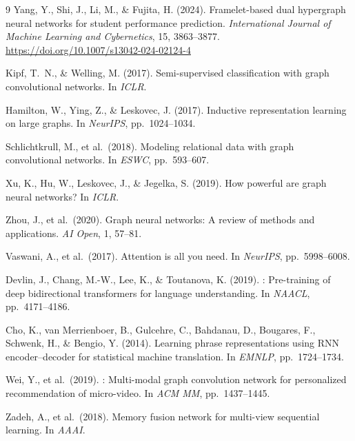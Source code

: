 \documentclass[sigconf,review]{acmart}
\begin{document}
\begin{thebibliography}{9}
Yang, Y., Shi, J., Li, M., \& Fujita, H. (2024).
\newblock Framelet-based dual hypergraph neural networks for student
  performance prediction.
\newblock \emph{International Journal of Machine Learning and Cybernetics},
  15, 3863--3877.
\newblock \url{https://doi.org/10.1007/s13042-024-02124-4}

Kipf, T.~N., \& Welling, M. (2017).
\newblock Semi-supervised classification with graph
  convolutional networks.
\newblock In \emph{ICLR}.

Hamilton, W., Ying, Z., \& Leskovec, J. (2017).
\newblock Inductive representation learning on large
  graphs.
\newblock In \emph{NeurIPS}, pp.\ 1024--1034.

Schlichtkrull, M., et al.\ (2018).
\newblock Modeling relational data with graph
  convolutional networks.
\newblock In \emph{ESWC}, pp.\ 593--607.

Xu, K., Hu, W., Leskovec, J., \& Jegelka, S. (2019).
\newblock How powerful are graph neural networks?
\newblock In \emph{ICLR}.

Zhou, J., et al.\ (2020).
\newblock Graph neural networks: A review of methods
  and applications.
\newblock \emph{AI Open}, 1, 57--81.

Vaswani, A., et al.\ (2017).
\newblock Attention is all you need.
\newblock In \emph{NeurIPS}, pp.\ 5998--6008.

Devlin, J., Chang, M.-W., Lee, K., \& Toutanova, K.
  (2019).
: Pre-training of deep bidirectional
  transformers for language understanding.
\newblock In \emph{NAACL}, pp.\ 4171--4186.

Cho, K., van Merrienboer, B., Gulcehre, C.,
  Bahdanau, D., Bougares, F., Schwenk, H.,
  \& Bengio, Y. (2014).
\newblock Learning phrase representations using
  {RNN} encoder--decoder for statistical machine
  translation.
\newblock In \emph{EMNLP}, pp.\ 1724--1734.

Wei, Y., et al.\ (2019).
: Multi-modal graph convolution
  network for personalized recommendation of
  micro-video.
\newblock In \emph{ACM MM}, pp.\ 1437--1445.

Zadeh, A., et al.\ (2018).
\newblock Memory fusion network for multi-view
  sequential learning.
\newblock In \emph{AAAI}.


\end{thebibliography}
\end{document}
